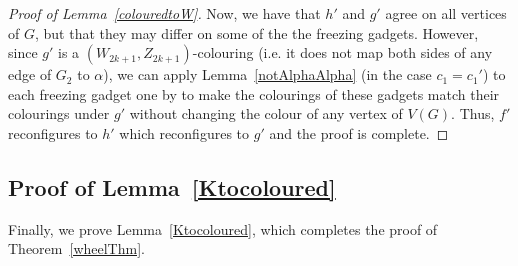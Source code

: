 \documentclass[11 pt]{amsart}
\theoremstyle{definition}
\theoremstyle{case}
\numberwithin{equation}{section}
\begin{document}
\begin{proof}[Proof of Lemma~\ref{colouredtoW}]
Now, we have that $h'$ and $g'$ agree on all vertices of $G$, but that they may differ on some of the the freezing gadgets. However, since $g'$ is a $(W_{2k+1},Z_{2k+1})$-colouring (i.e. it does not map both sides of any edge of $G_2$ to $\alpha$), we can apply Lemma~\ref{notAlphaAlpha} (in the case $c_1=c_1'$) to each freezing gadget one by to make the colourings of these gadgets match their colourings under $g'$ without changing the colour of any vertex of $V(G)$. Thus, $f'$ reconfigures to $h'$ which reconfigures to $g'$ and the proof is complete. 
\end{proof}

\subsection{Proof of Lemma~\ref{Ktocoloured}}

Finally, we prove Lemma~\ref{Ktocoloured}, which completes the proof of Theorem~\ref{wheelThm}.
\end{document}
